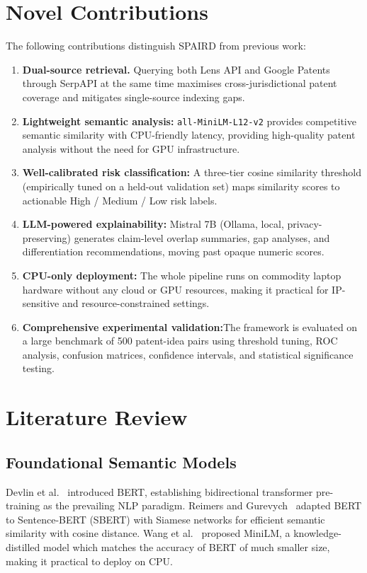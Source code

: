\documentclass[conference]{IEEEtran}
\begin{document}
\section{Novel Contributions}
The following contributions distinguish SPAIRD from previous work: \begin{enumerate}[leftmargin=*,label=\textbf{C\arabic*.}]
  \item \textbf{Dual-source retrieval.} Querying both Lens API and Google Patents through SerpAPI at the same time maximises cross-jurisdictional patent coverage and mitigates single-source indexing gaps.
  \item \textbf{Lightweight semantic analysis:} \texttt{all-MiniLM-L12-v2} provides competitive semantic similarity with CPU-friendly latency, providing high-quality patent analysis without the need for GPU infrastructure.
  \item \textbf{Well-calibrated risk classification:} A three-tier cosine similarity threshold (empirically tuned on a held-out validation set) maps similarity scores to actionable High / Medium / Low risk labels.
  \item \textbf{LLM-powered explainability:} Mistral 7B (Ollama, local, privacy-preserving) generates claim-level overlap summaries, gap analyses, and differentiation recommendations, moving past opaque numeric scores.
  \item \textbf{CPU-only deployment:}  The whole pipeline runs on commodity laptop hardware without any cloud or GPU resources, making it practical for IP-sensitive and resource-constrained settings.
  \item \textbf{Comprehensive experimental validation:}The framework is evaluated on a large benchmark of 500 patent-idea pairs using threshold tuning, ROC analysis, confusion matrices, confidence intervals, and statistical significance testing.
\end{enumerate}

\section{Literature Review}

\subsection{Foundational Semantic Models}

Devlin et al.~\cite{devlin2019bert} introduced BERT, establishing bidirectional transformer pre-training as the prevailing NLP paradigm.
Reimers and Gurevych~\cite{reimers2019sbert} adapted BERT to Sentence-BERT (SBERT) with Siamese networks for efficient semantic similarity with cosine distance. Wang et al.~\cite{wang2020minilm} proposed MiniLM, a knowledge-distilled model which matches the accuracy of BERT of much smaller size, making it practical to deploy on CPU.
\end{document}
